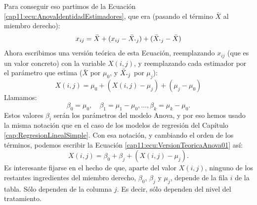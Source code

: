 Para conseguir eso partimos de la Ecuación \ref{cap11:ecu:AnovaIdentidadEstimadores}, que era (pasando el término $\bar X$ al miembro derecho):
\begin{equation}
\label{cap11:ecu:VersionMuestralAnova01}
    x_{ij}=\bar X+(x_{ij}-\bar X_{\mbox{\bf\large $\cdot$}j})+(\bar X_{\mbox{\bf\large$\cdot$}j}-\bar X)
\end{equation}
Ahora escribimos una versión teórica de esta Ecuación, reemplazando $x_{ij}$ (que es un valor concreto) con la variable $X(i,j)$,  y reemplazando cada estimador por el parámetro que estima ($\bar X$ por $\mu_0$, y $\bar X_{\mbox{\bf\large $\cdot$}j}$ por $\mu_j$):
\begin{equation}
\label{cap11:ecu:VersionTeoricaAnova01}
    X(i,j)=\mu_0+(X(i,j)-\mu_j)+(\mu_j-\mu_0)
\end{equation}
Llamamos:
\begin{equation}
\label{cap11:ecu:CoeficientesBetaAnovaComoModeloLineal}
    \beta_0=\mu_0,\quad \beta_1=\mu_1-\mu_0,\ldots,\beta_k=\mu_k-\mu_0.
\end{equation}
Estos valores $\beta_i$ serán los {\sf parámetros} del modelo Anova, y por eso hemos usado la misma notación que en el caso de los modelos de regresión del Capítulo \ref{cap:RegresionLinealSimple}. Con esa notación, y cambiando el orden de los términos, podemos escribir la Ecuación \ref{cap11:ecu:VersionTeoricaAnova01} así:
\begin{equation}
\label{cap11:ecu:VersionTeoricaAnova02}
X(i,j)=\beta_0+\beta_j+(X(i,j)-\mu_j).
\end{equation}
Es interesante fijarse en el hecho de que, aparte del valor $X(i,j)$, ninguno de los restantes ingredientes del miembro derecho, $\beta_0$, $\beta_j$ y $\mu_j$, depende de la fila $i$ de la tabla. Sólo dependen de la columna $j$. Es decir, sólo dependen del nivel del tratamiento.

